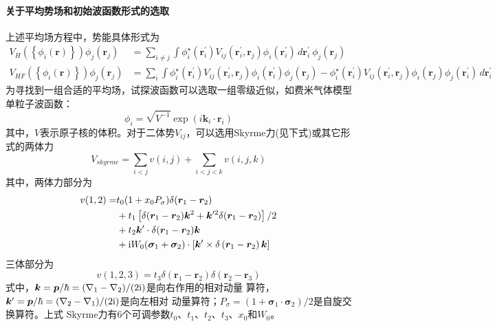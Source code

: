 \paragraph*{关于平均势场和初始波函数形式的选取}
上述平均场方程中，势能具体形式为\citep[][Eqs. C2.3 and C2.6]{ningpz}
\begin{equation}\boxed{\begin{aligned}
    V_{H}\left( \left\{ \phi_i(\bm{r}) \right\} \right) \phi_j(\bm{r}_j) &= \sum_{i \neq j} \int 
    \phi_i^{\star}(\bm{r}_i^{\prime}) V_{ij}(\bm{r}_i^{\prime}, \bm{r}_j) \phi_{i}(\bm{r}_i^{\prime})
    \,d\bm{r}_i^{\prime}\ \phi_j(\bm{r}_j) \\
	V_{HF}\left( \left\{ \phi_i(\bm{r}) \right\} \right) \phi_j(\bm{r}_j) &= \sum_{i} \int 
    \phi_i^{\star}(\bm{r}_i^{\prime}) V_{ij}(\bm{r}_i^{\prime}, \bm{r}_j) \phi_{i}(\bm{r}_i^{\prime}) \phi_j(\bm{r}_j) - \phi_i^{\star}(\bm{r}_i^{\prime}) V_{ij}(\bm{r}_i^{\prime}, \bm{r}_j) \phi_{i}(\bm{r}_j) \phi_j(\bm{r}_i^{\prime})
    \,d\bm{r}_i^{\prime}  
    \label{eq:mean-field}
\end{aligned}}\end{equation}
为寻找到一组合适的平均场，试探波函数可以选取一组零级近似，如费米气体模型单粒子波函数：
\begin{equation}
    \phi_i = \sqrt{V^{-1}} \exp{(i \bm{k}_i \cdot \bm{r}_i)}
    \label{eq:fermi-gas-eigen}
\end{equation}
其中，$V$表示原子核的体积。对于二体势$V_{ij}$，可以选用Skyrme力(见下式)或其它形式的两体力
\begin{equation}
    V_{skyrme} = \sum_{i<j} v(i, j) + \sum_{i<j<k} v(i, j, k)
    \label{eq:skyrme-forc}
\end{equation}
其中，两体力部分为
\begin{equation}
    \begin{aligned}
        v(1, 2) =& t_0 (1 + x_0 P_{\sigma})\delta(\bm{r}_1 - \bm{r}_2) \\
            & + t_1\left[ \delta(\bm{r}_1 - \bm{r}_2) \bm{k}^{2}
              + \bm{k}^{\prime 2}\delta(\bm{r}_1 - \bm{r}_2)\right] / 2 \\
            & + t_2\bm{k}^{\prime} \cdot \delta(\bm{r}_1 - \bm{r}_2) \bm{k} \\
            & + {\rm i} W_0(\bm{\sigma}_1 + \bm{\sigma}_2)\cdot \left[ 
            \bm{k}^{\prime} \times \delta\left( \bm{r}_1 - \bm{r}_2 \right) \bm{k}\right]
    \end{aligned}
    \label{eq:skyrme-tow-body-forc}
\end{equation}
三体部分为
\begin{equation}
    v(1, 2, 3) = t_3 \delta(\bm{r}_1 - \bm{r}_2) \delta(\bm{r}_2 - \bm{r}_3)
    \label{eq:skyrm-three-body-forc}
\end{equation}
式中，$\bm{k} = \bm{p}/\hbar = (\nabla_{1} - \nabla_{2}) / (2{\rm i})$是向右作用的相对动量
算符，$\bm{k}^{\prime} = \bm{p}/\hbar = (\nabla_{2} - \nabla_{1}) / (2{\rm i})$是向左相对
动量算符；$P_{\sigma} = (1 + \bm{\sigma}_1 \cdot \bm{\sigma}_2) / 2$是自旋交换算符。上式
Skyrme力有6个可调参数$t_0$、$t_1$、$t_2$、$t_3$、$x_0$和$W_0$。

